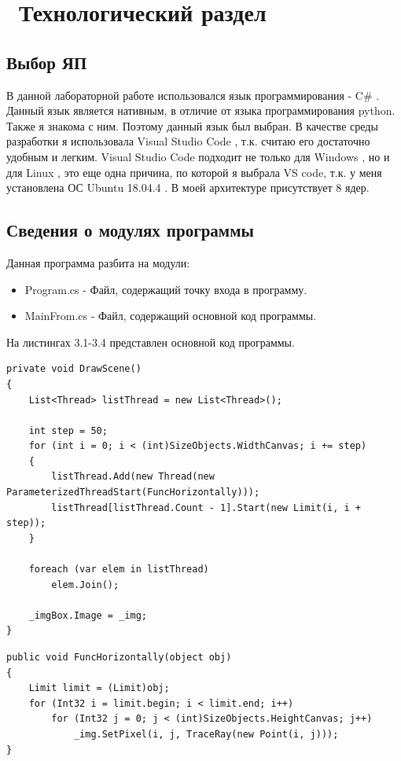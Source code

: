 \chapter{ Технологический раздел}
\label{cha:design}

\section{Выбор ЯП}

В данной лабораторной работе использовался язык программирования - C\# \cite{bib1}.
Данный язык является нативным, в отличие от языка программирования python. Также я знакома с ним.
Поэтому данный язык был выбран. 
В качестве среды разработки я использовала Visual Studio Code \cite{bib2}, т.к. считаю его достаточно удобным и легким.
Visual Studio Code подходит не только для  Windows \cite{bib3}, но и для Linux \cite{bib4}, это еще одна причина, по которой я выбрала VS code, т.к. у меня установлена ОС Ubuntu 18.04.4 \cite{bib5}.
В моей архитектуре присутствует 8 ядер.

\section{Сведения о модулях программы}

Данная программа разбита на модули:

\begin{itemize}
	\item Program.cs - Файл, содержащий точку входа в программу.
	\item MainFrom.cs - Файл, содержащий основной код программы.
\end{itemize}

На листингах 3.1-3.4 представлен основной код программы.

\begin{lstlisting}[label=some-code,caption=Метод создания и запуска потоков]
private void DrawScene()
{
	List<Thread> listThread = new List<Thread>();

	int step = 50;
	for (int i = 0; i < (int)SizeObjects.WidthCanvas; i += step)
	{
		listThread.Add(new Thread(new ParameterizedThreadStart(FuncHorizontally)));
		listThread[listThread.Count - 1].Start(new Limit(i, i + step));
	}

	foreach (var elem in listThread)
		elem.Join();

	_imgBox.Image = _img;
}
\end{lstlisting}

\begin{lstlisting}[label=some-code,caption=Метод потока разбиения горизонтально]
public void FuncHorizontally(object obj)
{
	Limit limit = (Limit)obj;
	for (Int32 i = limit.begin; i < limit.end; i++)
		for (Int32 j = 0; j < (int)SizeObjects.HeightCanvas; j++)
			_img.SetPixel(i, j, TraceRay(new Point(i, j)));
}
\end{lstlisting}

